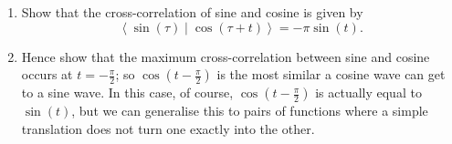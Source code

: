 \documentclass{article}
\newcommand{\braket}[2]{\left\langle #1 \mid #2 \right\rangle}
\begin{document}
\begin{enumerate}
	\item Show that the cross-correlation of sine and cosine is given by
		\[\braket{\sin(\tau)}{\cos(\tau+t)}=-\pi\sin(t).\]
	\item Hence show that the maximum cross-correlation between sine and cosine occurs at $t=-\frac{\pi}{2}$; so $\cos\left(t-\frac{\pi}{2}\right)$ is the most similar a cosine wave can get to a sine wave. In this case, of course, $\cos\left(t-\frac{\pi}{2}\right)$ is actually equal to $\sin(t)$, but we can generalise this to pairs of functions where a simple translation does not turn one exactly into the other.
\end{enumerate}




\clearpage
\end{document}
